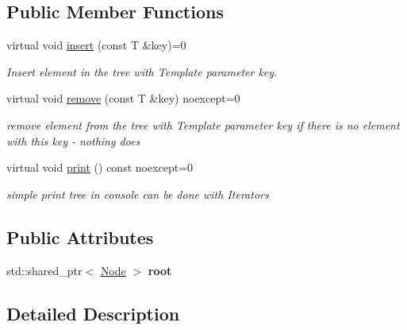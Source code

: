 \subsection*{Public Member Functions}
\begin{DoxyCompactItemize}
\item 
\mbox{\label{classTree_a33de7916dcffea3a4bebe97584f1c5c1}} 
virtual void \hyperlink{classTree_a33de7916dcffea3a4bebe97584f1c5c1}{insert} (const T \&key)=0
\begin{DoxyCompactList}\small\item\em Insert element in the tree with Template parameter key. \end{DoxyCompactList}\item 
\mbox{\label{classTree_a24d087ff6f8a6f342717361825280fda}} 
virtual void \hyperlink{classTree_a24d087ff6f8a6f342717361825280fda}{remove} (const T \&key) noexcept=0
\begin{DoxyCompactList}\small\item\em remove element from the tree with Template parameter key  if there is no element with this key -\/ nothing does \end{DoxyCompactList}\item 
\mbox{\label{classTree_ae6779310befe6ae12ac32f93195bdfe3}} 
virtual void \hyperlink{classTree_ae6779310befe6ae12ac32f93195bdfe3}{print} () const noexcept=0
\begin{DoxyCompactList}\small\item\em simple print tree in console  can be done with Iterators \end{DoxyCompactList}\end{DoxyCompactItemize}
\subsection*{Public Attributes}
\begin{DoxyCompactItemize}
\item 
\mbox{\label{classTree_a32eaa5ce266bb8896b57fb5527b6c8e9}} 
std\+::shared\+\_\+ptr$<$ \hyperlink{classTree_1_1Node}{Node} $>$ {\bfseries root}
\end{DoxyCompactItemize}


\subsection{Detailed Description}
